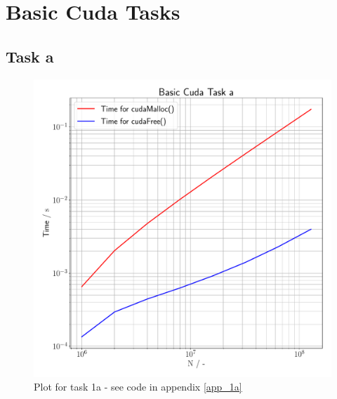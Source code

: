 \section{Basic Cuda Tasks}

\subsection{Task a}
\begin{figure}[h]
    \begin{center}
        \includegraphics[width=1\textwidth]{figures/task_1_a.pdf}
        \caption{Plot for task 1a - see code in appendix \ref{app_1a}}
        \label{task_1_a_plot}
    \end{center}
\end{figure}
\pagebreak

